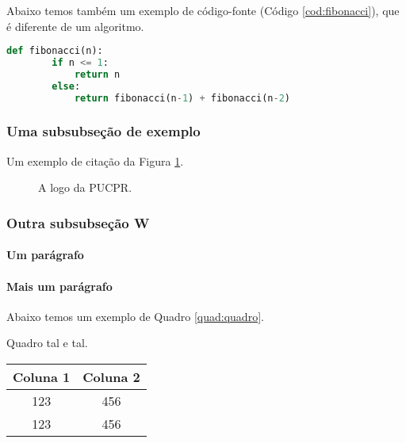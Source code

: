 \lipsum[2-4]

Abaixo temos também um exemplo de código-fonte (Código \ref{cod:fibonacci}), que é diferente de um algoritmo.
\begin{lstlisting}[language=Python, caption=A função de Fibonacci escrita em Python., label=cod:fibonacci]
	def fibonacci(n):
		if n <= 1:
			return n
		else:
			return fibonacci(n-1) + fibonacci(n-2)
\end{lstlisting}
	
	
\lipsum[2-4]		

\subsubsection{Uma subsubseção de exemplo}

Um exemplo de citação da Figura \ref{fig:logopucpr}.

\begin{figure}[!t]
	\centering
	\caption{A logo da PUCPR.}
	\label{fig:logopucpr}
\end{figure}	

\lipsum[2-4]	

\subsubsection{Outra subsubseção W}
	
\lipsum[2-4]	

\lipsum[2-4]		

\paragraph{Um parágrafo}

\lipsum[2-4]	
\lipsum[2-4]	
\paragraph{Mais um parágrafo}
\lipsum[2-4]	
\lipsum[2-4]	

Abaixo temos um exemplo de Quadro \ref{quad:quadro}.
\begin{quadro}
\centering
\caption{Quadro tal e tal.} \label{quad:quadro}
\begin{tabular}{c|c}
\hline
Coluna 1 & Coluna 2 \\
\hline
123 & 456\\
123 & 456\\
\hline
\end{tabular}

\end{quadro}

